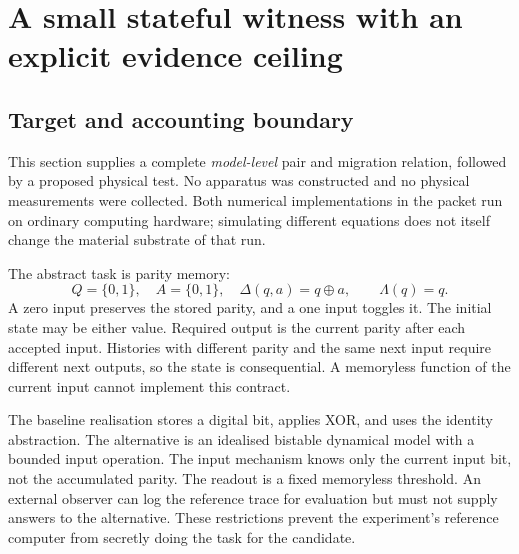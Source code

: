 \section{A small stateful witness with an explicit evidence ceiling}\label{sec:witness}
\subsection{Target and accounting boundary}
This section supplies a complete \emph{model-level} pair and migration relation, followed by a proposed physical test. No apparatus was constructed and no physical measurements were collected. Both numerical implementations in the packet run on ordinary computing hardware; simulating different equations does not itself change the material substrate of that run.

The abstract task is parity memory:
\begin{equation}\label{eq:parity}
 Q=\{0,1\},\quad A=\{0,1\},\quad \Delta(q,a)=q\mathbin{\oplus}a,
 \qquad\Lambda(q)=q.
\end{equation}
A zero input preserves the stored parity, and a one input toggles it. The initial state may be either value. Required output is the current parity after each accepted input. Histories with different parity and the same next input require different next outputs, so the state is consequential. A memoryless function of the current input cannot implement this contract.

The baseline realisation stores a digital bit, applies XOR, and uses the identity abstraction. The alternative is an idealised bistable dynamical model with a bounded input operation. The input mechanism knows only the current input bit, not the accumulated parity. The readout is a fixed memoryless threshold. An external observer can log the reference trace for evaluation but must not supply answers to the alternative. These restrictions prevent the experiment's reference computer from secretly doing the task for the candidate.

